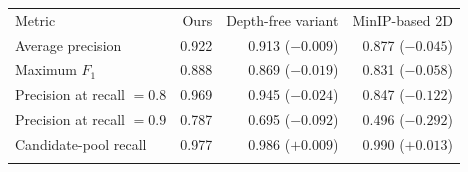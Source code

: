 \begin{tabular}{lrrr}
\tophline
Metric & Ours & Depth-free variant & MinIP-based 2D \\
\middlehline
Average precision & 0.922 & 0.913 (${-0.009}$) & 0.877 (${-0.045}$) \\
Maximum $F_1$ & 0.888 & 0.869 (${-0.019}$) & 0.831 (${-0.058}$) \\
Precision at recall $=0.8$ & 0.969 & 0.945 (${-0.024}$) & 0.847 (${-0.122}$) \\
Precision at recall $=0.9$ & 0.787 & 0.695 (${-0.092}$) & 0.496 (${-0.292}$) \\
Candidate-pool recall & 0.977 & 0.986 (${+0.009}$) & 0.990 (${+0.013}$) \\
\bottomhline
\end{tabular}
